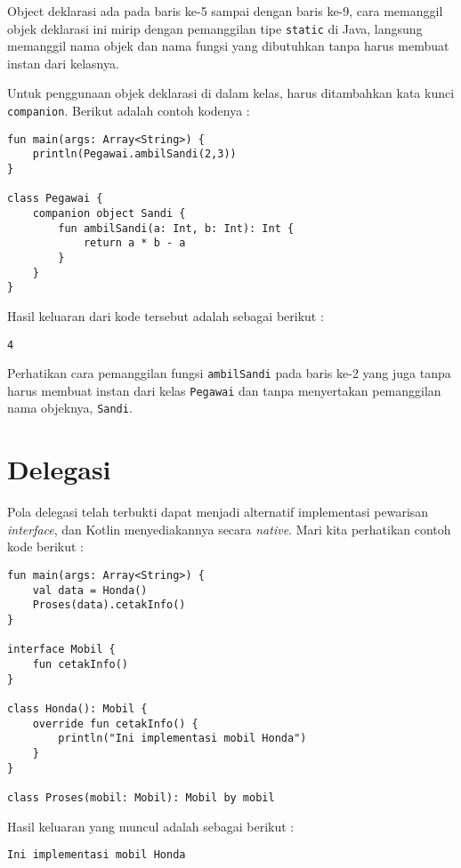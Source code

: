 Object deklarasi ada pada baris ke-5 sampai dengan baris ke-9, cara memanggil objek deklarasi ini mirip dengan pemanggilan tipe \texttt{static} di Java, langsung memanggil nama objek dan nama fungsi yang dibutuhkan tanpa harus membuat instan dari kelasnya.

Untuk penggunaan objek deklarasi di dalam kelas, harus ditambahkan kata kunci \texttt{companion}. Berikut adalah contoh kodenya :

\begin{lstlisting}
fun main(args: Array<String>) {
	println(Pegawai.ambilSandi(2,3))
}

class Pegawai {
	companion object Sandi {
		fun ambilSandi(a: Int, b: Int): Int {
			return a * b - a
		}
	}
}
\end{lstlisting}

Hasil keluaran dari kode tersebut adalah sebagai berikut :

\begin{lstlisting}
4
\end{lstlisting}

Perhatikan cara pemanggilan fungsi \texttt{ambilSandi} pada baris ke-2 yang juga tanpa harus membuat instan dari kelas \texttt{Pegawai} dan tanpa menyertakan pemanggilan nama objeknya, \texttt{Sandi}.

\section{Delegasi}

Pola delegasi telah terbukti dapat menjadi alternatif implementasi pewarisan \textit{interface}, dan Kotlin menyediakannya secara \textit{native}. Mari kita perhatikan contoh kode berikut :

\begin{lstlisting}
fun main(args: Array<String>) {
	val data = Honda()
	Proses(data).cetakInfo()
}

interface Mobil {
	fun cetakInfo()
}

class Honda(): Mobil {
	override fun cetakInfo() {
		println("Ini implementasi mobil Honda")
	}
}

class Proses(mobil: Mobil): Mobil by mobil
\end{lstlisting}

Hasil keluaran yang muncul adalah sebagai berikut :

\begin{lstlisting}
Ini implementasi mobil Honda
\end{lstlisting}

